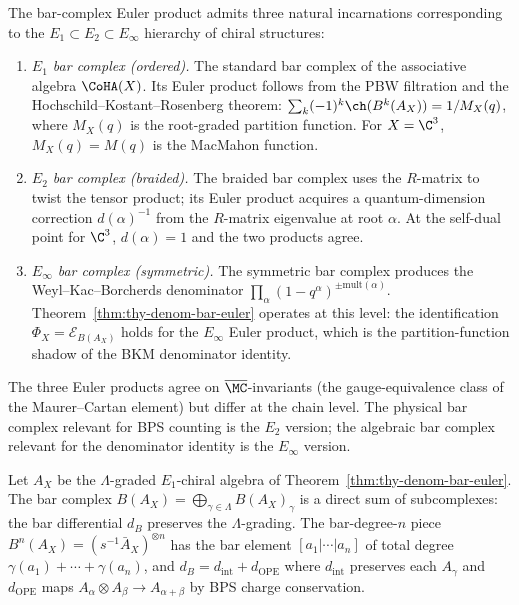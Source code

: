 \begin{remark}
\label{rem:thy-three-bar-complexes}
The bar-complex Euler product admits three natural incarnations corresponding to the $E_1 \subset E_2 \subset E_\infty$ hierarchy of chiral structures:
\begin{enumerate}[label=(\roman*)]
\item \emph{$E_1$ bar complex (ordered).} The standard bar complex of the associative algebra $\CoHA(X)$. Its Euler product follows from the PBW filtration and the Hochschild--Kostant--Rosenberg theorem: $\sum_k (-1)^k \ch(B^k(A_X)) = 1/M_X(q)$, where $M_X(q)$ is the root-graded partition function. For $X = \C^3$, $M_X(q) = M(q)$ is the MacMahon function.
\item \emph{$E_2$ bar complex (braided).} The braided bar complex uses the $R$-matrix to twist the tensor product; its Euler product acquires a quantum-dimension correction $d(\alpha)^{-1}$ from the $R$-matrix eigenvalue at root $\alpha$. At the self-dual point for $\C^3$, $d(\alpha) = 1$ and the two products agree.
\item \emph{$E_\infty$ bar complex (symmetric).} The symmetric bar complex produces the Weyl--Kac--Borcherds denominator $\prod_\alpha (1-q^\alpha)^{\pm\mathrm{mult}(\alpha)}$. Theorem~\ref{thm:thy-denom-bar-euler} operates at this level: the identification $\Phi_X = \mathcal{E}_{B(A_X)}$ holds for the $E_\infty$ Euler product, which is the partition-function shadow of the BKM denominator identity.
\end{enumerate}
The three Euler products agree on $\overline{\MC}$-invariants (the gauge-equivalence class of the Maurer--Cartan element) but differ at the chain level. The physical bar complex relevant for BPS counting is the $E_2$ version; the algebraic bar complex relevant for the denominator identity is the $E_\infty$ version.
\end{remark}

\begin{proposition}
\label{prop:bar-grading-preserved}
Let $A_X$ be the $\Lambda$-graded $E_1$-chiral algebra of Theorem~\ref{thm:thy-denom-bar-euler}. The bar complex $B(A_X) = \bigoplus_{\gamma \in \Lambda} B(A_X)_\gamma$ is a direct sum of subcomplexes: the bar differential $d_B$ preserves the $\Lambda$-grading. The bar-degree-$n$ piece $B^n(A_X) = (s^{-1}\bar A_X)^{\otimes n}$ has the bar element $[a_1|\cdots|a_n]$ of total degree $\gamma(a_1) + \cdots + \gamma(a_n)$, and $d_B = d_{\mathrm{int}} + d_{\mathrm{OPE}}$ where $d_{\mathrm{int}}$ preserves each $A_\gamma$ and $d_{\mathrm{OPE}}$ maps $A_\alpha \otimes A_\beta \to A_{\alpha+\beta}$ by BPS charge conservation.
\end{proposition}

